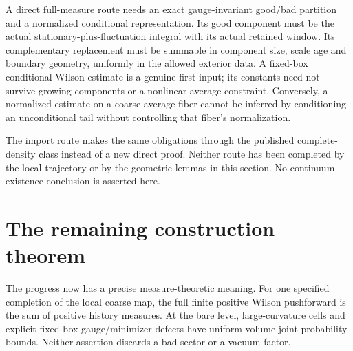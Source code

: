 \documentclass[11pt]{article}
\theoremstyle{remark}
\begin{document}
A direct full-measure route needs an exact gauge-invariant
good/bad partition and a normalized conditional representation.
Its good component must be the actual stationary-plus-fluctuation
integral with its actual retained window. Its complementary
replacement must be summable in component size, scale age and
boundary geometry, uniformly in the allowed exterior data.
A fixed-box conditional Wilson estimate is a genuine first input;
its constants need not survive growing components or a nonlinear
average constraint. Conversely, a normalized estimate on a
coarse-average fiber cannot be inferred by conditioning an
unconditional tail without controlling that fiber's normalization.

The import route makes the same obligations through the published
complete-density class instead of a new direct proof. Neither
route has been completed by the local trajectory or by the
geometric lemmas in this section. No continuum-existence conclusion
is asserted here.


\section{The remaining construction theorem}
\label{fmb:remaining}

The progress now has a precise measure-theoretic meaning. For one
specified completion of the local coarse map, the full finite
positive Wilson pushforward is the sum of positive history measures.
At the bare level, large-curvature cells and explicit fixed-box
gauge/minimizer defects have uniform-volume joint probability
bounds. Neither assertion discards a bad sector or a vacuum factor.
\end{document}

